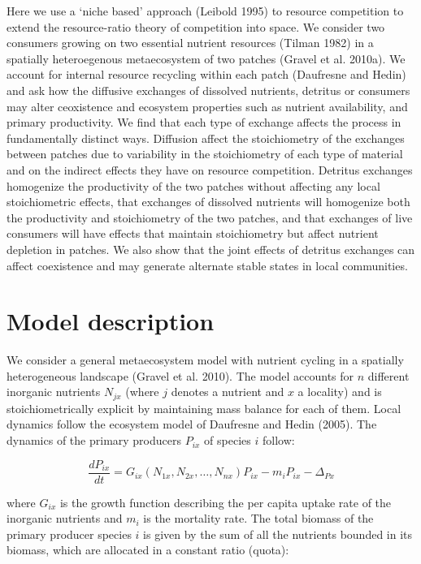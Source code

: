 \documentclass[letterpaper,twocolumn,showkeys]{revtex4-1}
\begin{document}
Here we use a ‘niche based’ approach (Leibold 1995) to resource competition to extend the resource-ratio theory of competition into space. We consider two consumers growing on two essential nutrient resources (Tilman 1982) in a spatially heteroegenous metaecosystem of two patches (Gravel et al. 2010a).  We account for internal resource recycling within each patch (Daufresne and Hedin) and ask how the diffusive exchanges of dissolved nutrients, detritus or consumers may alter ceoxistence and ecosystem properties such as nutrient availability, and primary productivity. We find that each type of exchange affects the process in fundamentally distinct ways. Diffusion affect the stoichiometry of the exchanges between patches due to variability in the stoichiometry of each type of material and on the indirect effects they have on resource competition. Detritus exchanges homogenize the productivity of the two patches without affecting any local stoichiometric effects, that exchanges of dissolved nutrients will homogenize both the productivity and stoichiometry of the two patches, and that exchanges of live consumers will have effects that maintain stoichiometry but affect nutrient depletion in patches.  We also show that the joint effects of detritus exchanges can affect coexistence and may generate alternate stable states in local communities. 

\section{Model description}
We consider a general metaecosystem model with nutrient cycling in a spatially heterogeneous landscape (Gravel et al. 2010). The model accounts for $n$ different inorganic nutrients $N_{jx}$ (where $j$ denotes a nutrient and $x$ a locality) and is stoichiometrically explicit by maintaining mass balance for each of them. Local dynamics follow the ecosystem model of Daufresne and Hedin (2005). The dynamics of the primary producers $P_{ix}$ of species $i$ follow:

\begin{equation}
	\label{e:bnet}
	\frac{dP_{ix}}{dt}=G_{ix}(N_{1x},N_{2x},…,N_{nx})P_{ix}-m_{i}P_{ix}-\Delta_{Px}
\end{equation}

where $G_{ix}$ is the growth function describing the per capita uptake rate of the inorganic nutrients and $m_{i}$ is the mortality rate. The total biomass of the primary producer species $i$ is given by the sum of all the nutrients bounded in its biomass, which are allocated in a constant ratio (quota): 
\end{document}
